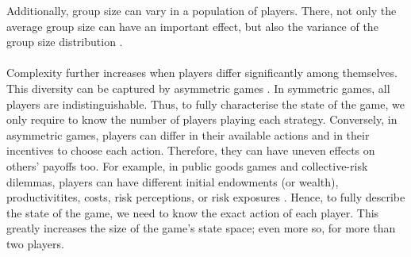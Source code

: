 \documentclass[11pt]{article}
\theoremstyle{plainCl1}
\theoremstyle{plainCl2}
\begin{document}
Additionally, 
group size can vary in a population of players. There, not only the average group size can have an important effect, but also the variance of the group size distribution \cite{Pena:Evolution:2011, Broom:BMB:2019}.
\\ \\ 
\noindent Complexity further increases when players differ significantly among themselves. This diversity can be captured by asymmetric games \cite{Taylor:JAP:1979, Schuster:AB:1981, Gaunersdorfer:TPB:1991, Hofbauer:JMB:1996, Hofbauer:GEB:2005, Ohtsuki:JTB:2010, McAvoy:PlosCB:2015, Veller:JET:2016, Hauser:Nature:2019}. In symmetric games, all players are indistinguishable. Thus, to fully characterise the state of the game, we only require to know the number of players playing each strategy. Conversely, in asymmetric games, players can differ in their available actions and in their incentives to choose each action.
Therefore, they can have uneven effects on others' payoffs too. For example, in public goods games and collective-risk dilemmas, players can have different initial endowments (or wealth), productivitites, costs, risk perceptions, or risk exposures \cite{Milinski:CC:2011, Vasconcelos:PNAS:2014, Abouchakra:JTB:2014, Hauser:Nature:2019, Merhej:JAIR:2022, Wang:PTRSB:2023}. Hence, to fully describe the state of the game, we need to know the exact action of each player. This greatly increases the size of the game's state space; even more so, for more than two players. \\
\end{document}
